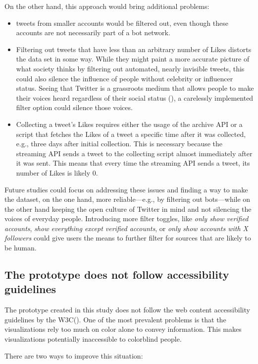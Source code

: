 On the other hand, this approach would bring additional problems:
\begin{itemize}
    \item tweets from smaller accounts would be filtered out, even though these accounts are not necessarily part of a bot network.
    \item Filtering out tweets that have less than an arbitrary number of Likes distorts the data set in some way. While they might paint a more accurate picture of what society thinks by filtering out automated, nearly invisible tweets, this could also silence the influence of people without celebrity or influencer status. Seeing that Twitter is a grassroots medium that allows people to make their voices heard regardless of their social status (\cite{passmann2019alte}), a carelessly implemented filter option could silence those voices.
    \item Collecting a tweet's Likes requires either the usage of the archive API or a script that fetches the Likes of a tweet a specific time after it was collected, e.g., three days after initial collection. This is necessary because the streaming API sends a tweet to the collecting script almost immediately after it was sent. This means that every time the streaming API sends a tweet, its number of Likes is likely 0.
\end{itemize}

Future studies could focus on addressing these issues and finding a way to make the dataset, on the one hand, more reliable---e.g., by filtering out bots---while on the other hand keeping the open culture of Twitter in mind and not silencing the voices of everyday people. Introducing more filter toggles, like \emph{only show verified accounts}, \emph{show everything except verified accounts}, or \emph{only show accounts with X followers} could give users the means to further filter for sources that are likely to be human.

\subsection*{The prototype does not follow accessibility guidelines}
The prototype created in this study does not follow the web content accessibility guidelines by the W3C(\cite{iso2iec}). One of the most prevalent problems is that the visualizations rely too much on color alone to convey information. This makes visualizations potentially inaccessible to colorblind people.

There are two ways to improve this situation:


